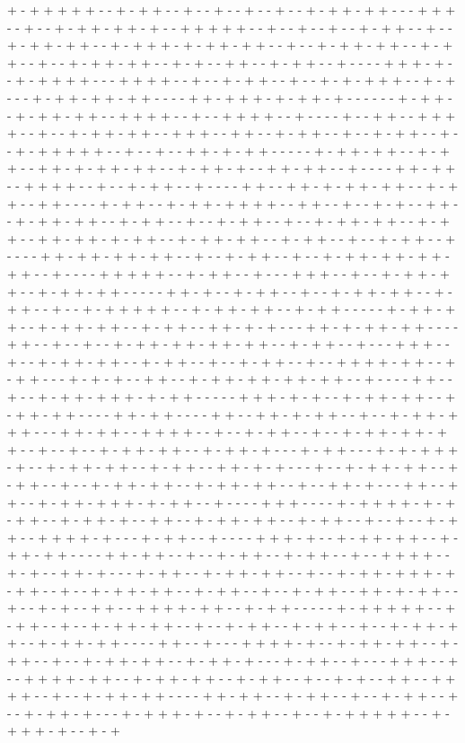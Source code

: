 + - + + + + + - - + - + + - - + - - + - - + - - + - - + - + + - + + - - - + + + - - + - - + - + + - + + - + - - + + + + + - - + - - + - - + - - + - + + - - + - - + - + + - + + - - + - + + + - + - + + - + + - - + - - + - + + - + + - - + - + + - - + - - + - + + - + + - - + - + - - + + - - + - + + - - + - - - - + + + - + - - + - + + + + - - - + + + + - - + - - + - + + - - + - - + - + - + + + - - + - + - - - + - + + - + + - + + - - - - + + - + + + - + - + + - + - - - - - - + - + + - - + - + + - + + - - + + + + - - + - - + + + + - - + - - - - + - - + + - - + + + + - - + - - + - + + - + + - - + + + - - + + - - + - + + - - + - - + - + + - - + - - + - + + + + + - - + - - + - - + + - + - + + - - - - - + - + + - + + - - + - + + - - + + - + - + + - + + - - + - + + - + - - + + - + + - - + - - - - + + - + + - - + + + + - - + - - + - + + - - + - - - - + + - - + + - + - + + - + + - - + - + + - - + + - - - - + - + + - - + - + + - + + + + - - + + - - + - - + - + - - + + - - + - + + - + + - - + - + + - - + - - + - + + - - + - - + - + + - + + - - + - + + - - + + - + + - + - + + - - + - + + - + + - - + - + + - - + - - + - + + - - + - - - - + + - + + - + + - + + - - + - - + - + + - - + - - + - + + - + + - + + - + + - - + - - - - + + + + + - - + - + + - - + - - - + + + - - + - - + - + + - + + - - + - + + - + + - - - - - + + - + - - + - + + - - + - - + - + + - + + - - + - + + - - + - - + - + + + + + - - + - + + - + + - - + - + + - - - - - + - + + - + + - - + - + + - + + - - + - + + - - + + - + - + - - - + + - + - + + - + + - - - - + + - - + - - + - - + - + + - + + - + + - + + - - + - + + - - + - - - + + + - - + - - + - + + - + + - - + - + + - - + - - + - + + - - + - - + + + + - + + - - + - + + - - - + - + - + - - + + - - + - + + - + + - + + - + + - - + - - - - + + - - + - - + - + + - + + + - + - + + - - - - - + + + - + - + - - + - + + - + + - - + - + + - + + - - - - + + - + + - - - - + + - - + + - + - + + - - + - - + - + + - + + + - - - + + - + + - - + + + + - - + - - + - + + - - + - - + - + + - + + - + + - - + - - + - - + - + + - + + - - + - + + - + - - - + - + + - - - + - + - + + + - + - - + - + + - + + - - + - + + - - + + - + - + - - - + - - + - + + - + + - - + - + + - - + - - + - + + - + + - - + - + + - + + - - + - - + + - + - - - + + - - + + - - + - + + - + + + - + - + + - - + - - - - + + + - - - - + - + + + + - + - + - + + - - + - + + - + - - + + - - + - + + - + + - - + - + + - - + - - + - - + - + + - - + + + + - + - - - + - + + - - + - - - - + + + - + - - + - + + - + + - - + - + + - + + - - - - + + - + + - - + - - + - + + - - + - + + - - + - - + + + + - - + - + - - + + - + - - - + - + + - - + - + + - + + - - + - - + - + + - + + + - + - + + - - + - - + - + + - + + - - + - + + - - + - - + - + + - - + + - + - + + - - + - - + - + - - + + - - + + + + - + + - - + - + + - - - - - + - + + + + + - - + - + + - - + - - + - + + - + + - - + - - + - + + - - + - + + - - + - - + - + + - + + - - + - + + - + + - - - - + + - - + - - - + + + + - + - - + - + + - + + - - + - + + - - + - - + - + + - + + - - + - + + - + - - - + - + + - - + - - - + + + - - + - - + + + + - + + - - + - + + - + + - - + - + + - - + - - + - + - - + + - - + + + + - - + - - + - + + - + + - - - - + + - + + - - + - + + - - + - - + - + + - - + - - + - + + - + - - - + - + + + - + - - + - + + - - + - - + - + + + + + - - + - + + + - + - - + - + 